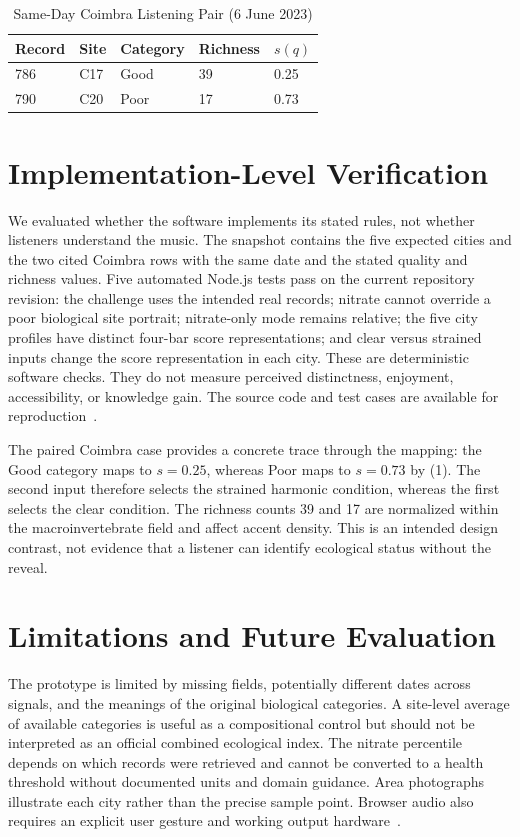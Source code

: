 \documentclass[conference]{IEEEtran}
\begin{document}
\begin{table}[t]
\caption{Same-Day Coimbra Listening Pair (6 June 2023)}
\label{tab:pair}
\centering
\footnotesize
\begin{tabular}{lllll}
\toprule
Record & Site & Category & Richness & $s(q)$ \\
\midrule
786 & C17 & Good & 39 & 0.25 \\
790 & C20 & Poor & 17 & 0.73 \\
\bottomrule
\end{tabular}
\end{table}

\section{Implementation-Level Verification}
We evaluated whether the software implements its stated rules, not whether listeners understand the music. The snapshot contains the five expected cities and the two cited Coimbra rows with the same date and the stated quality and richness values. Five automated Node.js tests pass on the current repository revision: the challenge uses the intended real records; nitrate cannot override a poor biological site portrait; nitrate-only mode remains relative; the five city profiles have distinct four-bar score representations; and clear versus strained inputs change the score representation in each city. These are deterministic software checks. They do not measure perceived distinctness, enjoyment, accessibility, or knowledge gain. The source code and test cases are available for reproduction~\cite{songsoong-code}.

The paired Coimbra case provides a concrete trace through the mapping: the Good category maps to $s=0.25$, whereas Poor maps to $s=0.73$ by (1). The second input therefore selects the strained harmonic condition, whereas the first selects the clear condition. The richness counts 39 and 17 are normalized within the macroinvertebrate field and affect accent density. This is an intended design contrast, not evidence that a listener can identify ecological status without the reveal.

\section{Limitations and Future Evaluation}
The prototype is limited by missing fields, potentially different dates across signals, and the meanings of the original biological categories. A site-level average of available categories is useful as a compositional control but should not be interpreted as an official combined ecological index. The nitrate percentile depends on which records were retrieved and cannot be converted to a health threshold without documented units and domain guidance. Area photographs illustrate each city rather than the precise sample point. Browser audio also requires an explicit user gesture and working output hardware~\cite{tonejs}.
\end{document}
